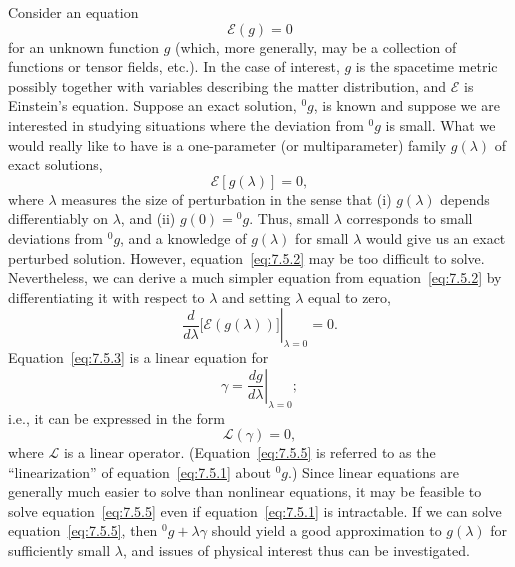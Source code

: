 Consider an equation
\begin{equation}
  \mathcal E(g)=0
  \tag{7.5.1}\label{eq:7.5.1}
\end{equation}
for an unknown function \(g\) (which, more generally, may be a collection of
functions or tensor fields, etc.). In the case of interest, \(g\) is the spacetime
metric possibly together with variables describing the matter distribution, and
\(\mathcal E\) is Einstein's equation. Suppose an exact solution, \({}^{0}g\), is
known and suppose we are interested in studying situations where the deviation
from \({}^{0}g\) is small. What we would really like to have is a one-parameter
(or multiparameter) family \(g(\lambda)\) of exact solutions,
\begin{equation}
  \mathcal E[g(\lambda)]=0 ,
  \tag{7.5.2}\label{eq:7.5.2}
\end{equation}
where \(\lambda\) measures the size of perturbation in the sense that
(i) \(g(\lambda)\) depends differentiably on \(\lambda\), and
(ii) \(g(0)={}^{0}g\). Thus, small \(\lambda\) corresponds to small deviations
from \({}^{0}g\), and a knowledge of \(g(\lambda)\) for small \(\lambda\) would
give us an exact perturbed solution. However, equation~\eqref{eq:7.5.2} may be too
difficult to solve. Nevertheless, we can derive a much simpler equation from
equation~\eqref{eq:7.5.2} by differentiating it with respect to \(\lambda\) and
setting \(\lambda\) equal to zero,
\begin{equation}
  \left.
    \frac{d}{d\lambda}\bigl[\mathcal E(g(\lambda))\bigr]
  \right|_{\lambda=0}=0 .
  \tag{7.5.3}\label{eq:7.5.3}
\end{equation}
Equation~\eqref{eq:7.5.3} is a linear equation for
\begin{equation}
  \gamma=\left.\frac{dg}{d\lambda}\right|_{\lambda=0} ;
  \tag{7.5.4}\label{eq:7.5.4}
\end{equation}
i.e., it can be expressed in the form
\begin{equation}
  \mathcal L(\gamma)=0 ,
  \tag{7.5.5}\label{eq:7.5.5}
\end{equation}
where \(\mathcal L\) is a linear operator. (Equation~\eqref{eq:7.5.5} is referred
to as the “linearization” of equation~\eqref{eq:7.5.1} about \({}^{0}g\).) Since
linear equations are generally much easier to solve than nonlinear equations, it may
be feasible to solve equation~\eqref{eq:7.5.5} even if
equation~\eqref{eq:7.5.1} is intractable. If we can solve
equation~\eqref{eq:7.5.5}, then \({}^{0}g+\lambda\gamma\) should yield a good
approximation to \(g(\lambda)\) for sufficiently small \(\lambda\), and issues of
physical interest thus can be investigated.

